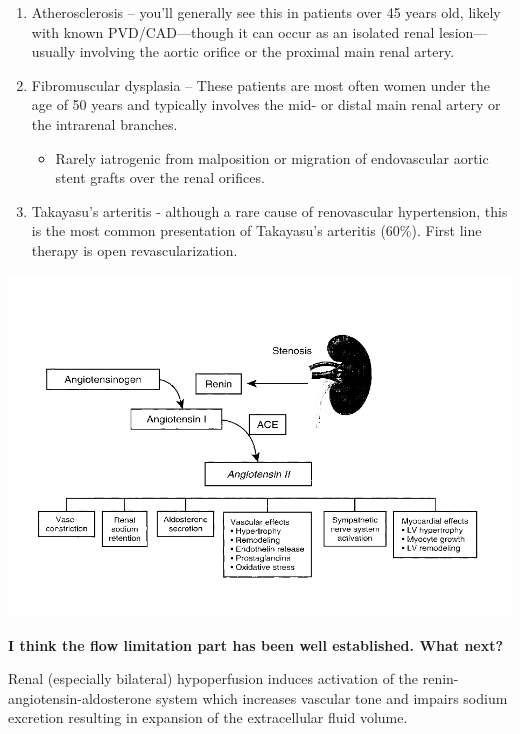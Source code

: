 \documentclass[
]{book}
\providecommand{\tightlist}{%
  \setlength{\itemsep}{0pt}\setlength{\parskip}{0pt}}
\begin{document}
\begin{enumerate}
\def\labelenumi{\arabic{enumi}.}
\item
  Atherosclerosis -- you'll generally see this in patients over 45
  years old, likely with known PVD/CAD---though it can occur as an
  isolated renal lesion---usually involving the aortic orifice or the
  proximal main renal artery.
\item
  Fibromuscular dysplasia -- These patients are most often women under
  the age of 50 years and typically involves the mid- or distal main
  renal artery or the intrarenal branches.

  \begin{itemize}
  \tightlist
  \item
    Rarely iatrogenic from malposition or migration of endovascular
    aortic stent grafts over the renal orifices.
  \end{itemize}
\item
  Takayasu's arteritis - although a rare cause of renovascular
  hypertension, this is the most common presentation of Takayasu's
  arteritis (60\%). First line therapy is open revascularization.
  \citep{ehlert139TakayasuDisease2019, weaverRenalRevascularizationTakayasu2004, zhuTakayasuArteritisImaging2012}
\end{enumerate}

\includegraphics[width=13in]{images/renal1}

\textbf{I think the flow limitation part has been well established. What
next?}

Renal (especially bilateral) hypoperfusion induces activation of the
renin-angiotensin-aldosterone system which increases vascular tone and
impairs sodium excretion resulting in expansion of the extracellular
fluid volume.
\end{document}
